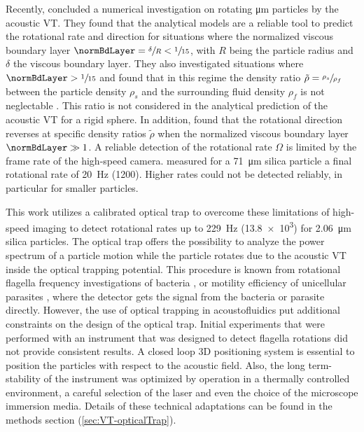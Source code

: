 Recently, \citeauthor{Hahn2016} \cite{Hahn2016} concluded a numerical 
investigation on rotating \si{\micro\meter} particles by the acoustic VT\@. They 
found that the analytical models are a reliable tool to predict the rotational 
rate and direction for situations where the normalized viscous boundary layer 
$\normBdLayer = \sfrac{\delta}{R} < \sfrac{1}{15}$, with $R$ being the particle 
radius and $\delta$ the viscous boundary layer. They also investigated 
situations where $\normBdLayer > \sfrac{1}{15}$ and found that in this regime 
the density ratio $\tilde{\rho} = \sfrac{\rho_{s}}{\rho_{f}}$ between the 
particle density $\rho_{s}$ and the surrounding fluid density $\rho_{f}$ is not 
neglectable \cite{Hahn2016}. This ratio is not considered in the analytical 
prediction of the acoustic VT for a rigid sphere. In addition, 
\citeauthor{Hahn2016} \cite{Hahn2016} found that the rotational direction 
reverses at specific density ratios $\tilde{\rho}$ when the normalized viscous 
boundary layer $\normBdLayer \gg 1$. A reliable detection of the rotational rate 
$\Omega$ is limited by the frame rate of the high-speed camera.  
\citeauthor{Lamprecht2013} \cite{Lamprecht2013} measured for a \SI{71}{\micro\meter} 
silica particle a final rotational rate of \SI{20}{\hertz} (\SI{1200}{\rpm}).  
Higher rates could not be detected reliably, in particular for smaller 
particles.

This work utilizes a calibrated optical trap to overcome these limitations of 
high-speed imaging to detect rotational rates up to \SI{229}{\hertz} 
(\SI{13.8e3}{\rpm}) for \SI{2.06}{\micro\meter} silica particles. The optical 
trap offers the possibility to analyze the power spectrum of a particle motion 
while the particle rotates due to the acoustic VT inside the optical trapping 
potential.  This procedure is known from rotational flagella frequency 
investigations of bacteria \cite{Kirchner2014}, or motility efficiency of 
unicellular parasites \cite{Stellamanns2014}, where the detector gets the 
signal from the bacteria or parasite directly. However, the use of optical 
trapping in acoustofluidics put additional constraints on the design of the 
optical trap.  Initial experiments that were performed with an instrument that 
was designed to detect flagella rotations did not provide consistent results. A 
closed loop 3D positioning system is essential to position the particles with 
respect to the acoustic field. Also, the long term-stability of the instrument 
was optimized by operation in a thermally controlled environment, a careful 
selection of the laser and even the choice of the microscope immersion media.  
Details of these technical adaptations can be found in the methods section 
(\ref{sec:VT-opticalTrap}).


